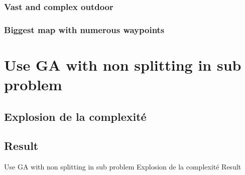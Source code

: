 \subsubsection{Vast and complex outdoor}\label{sec:fey_map_CPPP}
\subsubsection{Biggest map with numerous waypoints}

\section{Use GA with non splitting in sub problem }
		\subsection{Explosion  de la complexité }
		\subsection{Result }
Use GA with non splitting in sub problem
			Explosion  de la complexité 
			Result 




